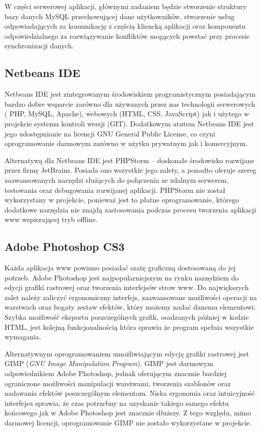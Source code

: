 W części serwerowej aplikacji, głównymi zadaniem będzie stworzenie struktury bazy danych MySQL przechowującej dane użytkowników, stworzenie usług odpowiadających za komunikację z częścią kliencką aplikacji oraz komponentu odpowiedzialnego za rozwiązywanie konfliktów mogących powstać przy procesie synchronizacji danych.

\subsection{Netbeans IDE}
\label{sec:netbeans}

Netbeans IDE jest zintegrowanym środowiskiem programistycznym posiadającym bardzo dobre wsparcie zarówno dla używanych przez nas technologii serwerowych ( PHP, MySQL, Apache), webowych (HTML, CSS, JavaScript) jak i użytego w projekcie systemu kontroli wersji (GIT). Dodatkowym atutem Netbeans IDE jest jego udostępnianie na licencji GNU General Public License, co czyni oprogramowanie darmowym zarówno w użytku prywatnym jak i komercyjnym.

Alternatywą dla Netbeans IDE jest PHPStorm -- doskonałe środowisko rozwijane przez firmę JetBrains. Posiada ono wszystkie jego zalety, a ponadto oferuje szereg zaawansowanych narzędzi służących do połączenia ze zdalnym serwerem, testowania oraz debugowania rozwijanej aplikacji. PHPStorm nie został wykorzystany w projekcie, ponieważ jest to płatne oprogramowanie, którego dodatkowe narzędzia nie znajdą zastosowania podczas procesu tworzenia aplikacji www wspierającej tryb offline.

\subsection{Adobe Photoshop CS3}
\label{sec:photoshop}

Każda aplikacja www powinno posiadać szatę graficzną dostosowaną do jej potrzeb. Adobe Photoshop jest najpopularniejszym na rynku narzędziem do edycji grafiki rastrowej oraz tworzenia interfejsów strow www. Do największych zalet należy zaliczyć ergonomiczny interfejs, zaawansowane możliwości operacji na warstwach oraz bogaty zestaw efektów, który możemy nadać danemu elementowi. Szybka możliwość eksportu poszczególnych grafik, osadzanych później w kodzie HTML, jest kolejną funkcjonalnością która sprawia że program spełnia wszystkie wymagania.

Alternatywnym oprogramowaniem umożliwiającym edycję grafiki rastrowej jest GIMP (\emph{GNU Image Manipulation Program}). GIMP jest darmowym odpowiednikiem Adobe Photoshop, jednak oferującym znacznie bardziej ograniczone możliwości manipulacji warstwami, tworzenia szablonów oraz nadawania efektów poszczególnym elementom. Niska ergonomia oraz intuicyjność interfejsu sprawia, że czas potrzebny na uzyskanie takiego samego efektu końcowego jak w Adobe Photoshop jest znacznie dłuższy. Z tego względu, mimo darmowej licencji, oprogramowanie GIMP nie zostało wykorzystane w projekcie.

